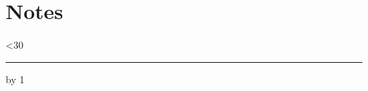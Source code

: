 \documentclass[9pt]{extarticle}
\begin{document}
\begin{multicols*}{3}
\raggedcolumns
\raggedright   %
\ifdefined\onlysection
\else
  \tableofcontents
  
  
  
  
  
  
  
  
  
  
  
  
  
  
\fi
\end{multicols*}
\ifdefined\onlysection\else
  \clearpage
  \thispagestyle{notes}
  \section*{Notes}
  {\color{black!25}\newcount\noteline
   \loop\ifnum\noteline<30 \vspace{5.4mm}\hrule\advance\noteline by 1 \repeat}
\fi
\end{document}
